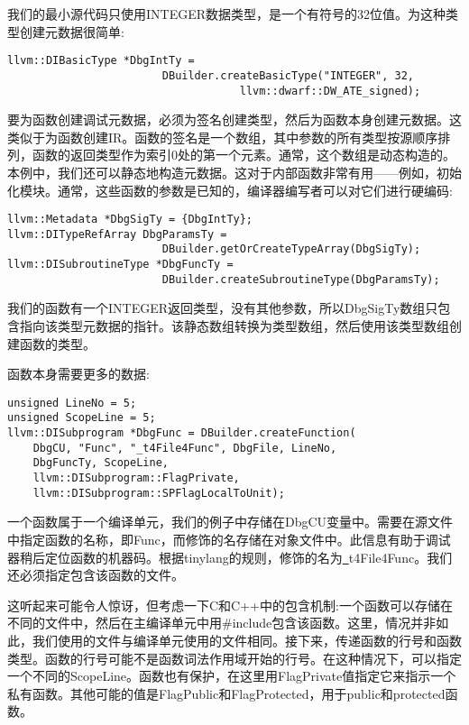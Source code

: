 我们的最小源代码只使用INTEGER数据类型，是一个有符号的32位值。为这种类型创建元数据很简单:\par

\begin{lstlisting}[caption={}]
llvm::DIBasicType *DbgIntTy =
						DBuilder.createBasicType("INTEGER", 32,
									llvm::dwarf::DW_ATE_signed);
\end{lstlisting}

要为函数创建调试元数据，必须为签名创建类型，然后为函数本身创建元数据。这类似于为函数创建IR。函数的签名是一个数组，其中参数的所有类型按源顺序排列，函数的返回类型作为索引0处的第一个元素。通常，这个数组是动态构造的。本例中，我们还可以静态地构造元数据。这对于内部函数非常有用——例如，初始化模块。通常，这些函数的参数是已知的，编译器编写者可以对它们进行硬编码:\par

\begin{lstlisting}[caption={}]
llvm::Metadata *DbgSigTy = {DbgIntTy};
llvm::DITypeRefArray DbgParamsTy =
						DBuilder.getOrCreateTypeArray(DbgSigTy);
llvm::DISubroutineType *DbgFuncTy =
						DBuilder.createSubroutineType(DbgParamsTy);
\end{lstlisting}

我们的函数有一个INTEGER返回类型，没有其他参数，所以DbgSigTy数组只包含指向该类型元数据的指针。该静态数组转换为类型数组，然后使用该类型数组创建函数的类型。\par

函数本身需要更多的数据:\par

\begin{lstlisting}[caption={}]
unsigned LineNo = 5;
unsigned ScopeLine = 5;
llvm::DISubprogram *DbgFunc = DBuilder.createFunction(
	DbgCU, "Func", "_t4File4Func", DbgFile, LineNo,
	DbgFuncTy, ScopeLine, 
	llvm::DISubprogram::FlagPrivate,
	llvm::DISubprogram::SPFlagLocalToUnit);
\end{lstlisting}

一个函数属于一个编译单元，我们的例子中存储在DbgCU变量中。需要在源文件中指定函数的名称，即Func，而修饰的名存储在对象文件中。此信息有助于调试器稍后定位函数的机器码。根据tinylang的规则，修饰的名为\underline{~}t4File4Func。我们还必须指定包含该函数的文件。\par

这听起来可能令人惊讶，但考虑一下C和C++中的包含机制:一个函数可以存储在不同的文件中，然后在主编译单元中用\#include包含该函数。这里，情况并非如此，我们使用的文件与编译单元使用的文件相同。接下来，传递函数的行号和函数类型。函数的行号可能不是函数词法作用域开始的行号。在这种情况下，可以指定一个不同的ScopeLine。函数也有保护，在这里用FlagPrivate值指定它来指示一个私有函数。其他可能的值是FlagPublic和FlagProtected，用于public和protected函数。\par

